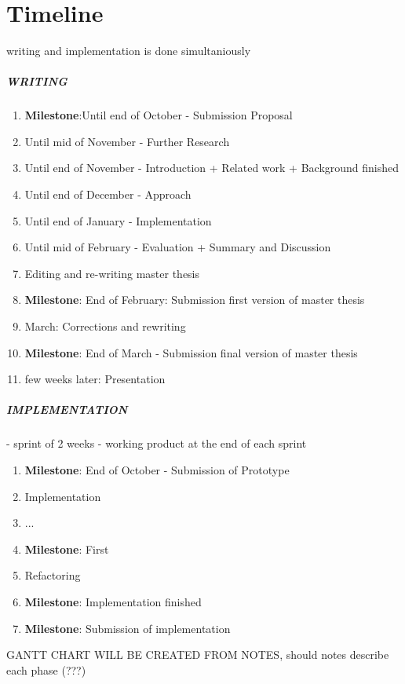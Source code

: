 \chapter{Timeline}
\label{ch:timeline}

writing and implementation is done simultaniously

\paragraph{WRITING}
\begin{enumerate}
    \item \textbf{Milestone}:Until end of October - Submission Proposal 
    \item Until mid of November -  Further Research
    \item Until end of November - Introduction + Related work + Background finished
    \item Until end of December -  Approach
    \item Until end of January - Implementation
    \item Until mid of February - Evaluation + Summary and Discussion
    \item Editing and re-writing master thesis
    \item \textbf{Milestone}: End of February: Submission first version of master thesis
    \item March: Corrections and rewriting
    \item \textbf{Milestone}: End of March - Submission final version of master thesis
    \item few weeks later: Presentation
\end{enumerate}

\paragraph{IMPLEMENTATION} - sprint of 2 weeks - working product at the end of each sprint
\begin{enumerate}
    \item \textbf{Milestone}: End of October - Submission of Prototype
    \item Implementation
    \item ...
    \item \textbf{Milestone}: First
    \item Refactoring
    \item \textbf{Milestone}: Implementation finished
    \item \textbf{Milestone}: Submission of implementation
\end{enumerate}

GANTT CHART WILL BE CREATED FROM NOTES, should notes describe each phase (???)

